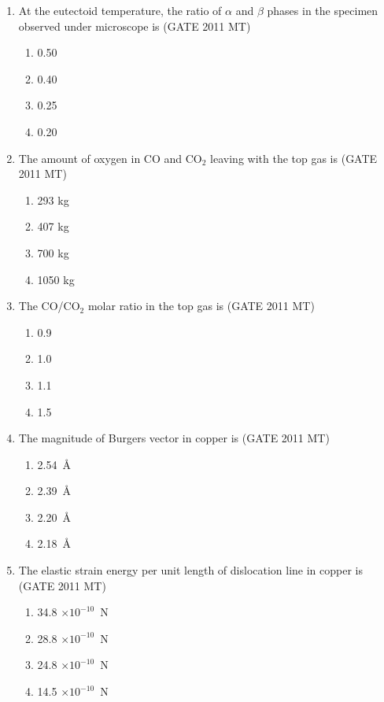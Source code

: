 \documentclass[12pt]{article}
\begin{document}
\begin{enumerate}
\item At the eutectoid temperature, the ratio of $\alpha$ and $\beta$ phases in the specimen observed under microscope is (GATE 2011 MT)
    \begin{enumerate}
        \item 0.50
        \item 0.40
        \item 0.25
        \item 0.20
    \end{enumerate}

\item The amount of oxygen in CO and CO$_2$ leaving with the top gas is (GATE 2011 MT)
    \begin{enumerate}
        \item 293 kg
        \item 407 kg
        \item 700 kg
        \item 1050 kg
    \end{enumerate}

\item The CO/CO$_2$ molar ratio in the top gas is (GATE 2011 MT)
    \begin{enumerate}
        \item 0.9
        \item 1.0
        \item 1.1
        \item 1.5
    \end{enumerate}

\item The magnitude of Burgers vector in copper is (GATE 2011 MT)
    \begin{enumerate}
        \item 2.54~\AA
        \item 2.39~\AA
        \item 2.20~\AA
        \item 2.18~\AA
    \end{enumerate}

\item The elastic strain energy per unit length of dislocation line in copper is (GATE 2011 MT)
    \begin{enumerate}
        \item 34.8 $\times 10^{-10}$~N
        \item 28.8 $\times 10^{-10}$~N
        \item 24.8 $\times 10^{-10}$~N
        \item 14.5 $\times 10^{-10}$~N
    \end{enumerate}


\end{enumerate}
\end{document}
